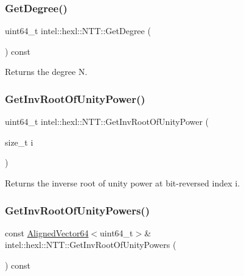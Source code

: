 \subsubsection{\texorpdfstring{Get\+Degree()}{GetDegree()}}
{\footnotesize\ttfamily uint64\+\_\+t intel\+::hexl\+::\+N\+T\+T\+::\+Get\+Degree (\begin{DoxyParamCaption}{ }\end{DoxyParamCaption}) const\hspace{0.3cm}{\ttfamily [inline]}}



Returns the degree N. 

\mbox{\label{classintel_1_1hexl_1_1NTT_a7dd5b59ed992c5466099999ce1eb15d6}} 
\subsubsection{\texorpdfstring{Get\+Inv\+Root\+Of\+Unity\+Power()}{GetInvRootOfUnityPower()}}
{\footnotesize\ttfamily uint64\+\_\+t intel\+::hexl\+::\+N\+T\+T\+::\+Get\+Inv\+Root\+Of\+Unity\+Power (\begin{DoxyParamCaption}\item[{size\+\_\+t}]{i }\end{DoxyParamCaption})\hspace{0.3cm}{\ttfamily [inline]}}



Returns the inverse root of unity power at bit-\/reversed index i. 

\mbox{\label{classintel_1_1hexl_1_1NTT_a509f384895cf97ef9cd2edd2902eb82a}} 
\subsubsection{\texorpdfstring{Get\+Inv\+Root\+Of\+Unity\+Powers()}{GetInvRootOfUnityPowers()}}
{\footnotesize\ttfamily const \hyperlink{namespaceintel_1_1hexl_afbdf0d2cc4209ee547a88ff22a02801b}{Aligned\+Vector64}$<$uint64\+\_\+t$>$\& intel\+::hexl\+::\+N\+T\+T\+::\+Get\+Inv\+Root\+Of\+Unity\+Powers (\begin{DoxyParamCaption}{ }\end{DoxyParamCaption}) const\hspace{0.3cm}{\ttfamily [inline]}}



